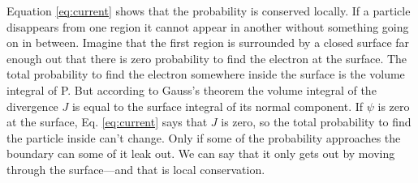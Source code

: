 \documentclass[a4paper,11pt]{article}
\begin{document}
Equation \ref{eq:current} shows that the probability is conserved locally. If a particle disappears from one region it cannot appear in another without something going on in between. Imagine that the first region is surrounded by a closed surface far enough out that there is zero probability to find the electron at the surface. The total probability to find the electron somewhere inside the surface is the volume integral of P. But according to Gauss’s theorem the volume integral of the divergence $J$ is equal to the surface integral of its normal component. If $\psi$ is zero at the surface, Eq. \ref{eq:current} says that $J$ is zero, so the total probability to find the particle inside can’t change. Only if some of the probability approaches the boundary can some of it leak out. We can say that it only gets out by moving through the surface—and that is local conservation.
\end{document}

